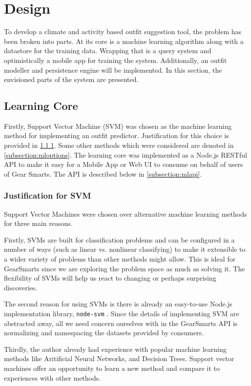 \section{Design}
\label{section:design}
To develop a climate and activity based outfit suggestion tool, the problem has been broken into parts.
At its core is a machine learning algorithm along with a datastore for the training data. Wrapping that is
a query system and optimistically a mobile app for training the system. Additionally, an outfit modeller and persistence
engine will be implemented. In this section, the envisioned parts of the system are presented.

\subsection{Learning Core}
Firstly, Support Vector Machine (SVM) was chosen as the machine learning method for implementing an outfit predictor.
Justification for this choice is provided in \ref{subsection:mlsvm}. Some other methods which were considered are
denoted in \ref{subsection:mloptions}. The learning core was implemented as a Node.js RESTful API to make it easy for a
Mobile App or Web UI to consume on behalf of users of Gear Smarts. The API is described below in \ref{subsection:mlapi}.

\subsubsection{Justification for SVM}
\label{subsection:mlsvm}
Support Vector Machines were chosen over alternative machine learning methods for three main reasons.

Firstly, SVMs are built for classification problems and can be configured in a number of ways (such as linear vs.
nonlinear classifying) to make it extensible to a wider variety of problems than other methods might allow. This is
ideal for GearSmarts since we are exploring the problem space as much as solving it. The flexibility of SVMs will
help us react to changing or perhaps surprising discoveries.

The second reason for using SVMs is there is already an easy-to-use Node.js implementation library, \texttt{node-svm}
\cite{Github:nodesvm}. Since the details of implementing SVM are abstracted away, all we need concern ourselves with in
the GearSmarts API is normalizing and namespacing the datasets provided by consumers.

Thirdly, the author already had experience with popular machine learning methods like Aritificial Neural Networks, and
Decision Trees. Support vector machines offer an opportunity to learn a new method and compare it to experiences with
other methods.


